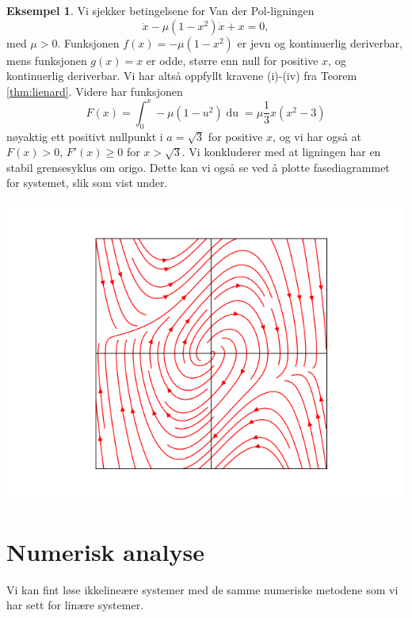 \documentclass{article}
\theoremstyle{plain}
\theoremstyle{definition}
\newtheorem{eksempel}[teorem]{Eksempel}
\theoremstyle{remark}
\newcommand{\diff}[1]{\mathop{d#1}}
\begin{document}
\begin{eksempel}
    Vi sjekker betingelsene for Van der Pol-ligningen
    \begin{equation*}
        \ddot{x} - \mu (1 - x^2) \dot{x} + x = 0,
    \end{equation*}
    med $\mu > 0$. Funksjonen $f(x) = -\mu (1 - x^2)$ er jevn og kontinuerlig deriverbar, mens funksjonen $g(x) = x$ er odde, større enn null for positive $x$, og kontinuerlig deriverbar. Vi har altså oppfyllt kravene (i)-(iv) fra Teorem \ref{thm:lienard}. Videre har funksjonen
    \begin{equation*}
        F(x) = \int_0^x -\mu(1-u^2) \diff{u} = \mu \frac{1}{3} x (x^2-3)
    \end{equation*}
    nøyaktig ett positivt nullpunkt i $a = \sqrt{3}$ for positive $x$, og vi har også at $F(x) > 0$, $F'(x) \geq 0$ for $x > \sqrt{3}$. Vi konkluderer med at ligningen har en stabil grensesyklus om origo. Dette kan vi også se ved å plotte fasediagrammet for systemet, slik som vist under.
    \begin{center}
        \includegraphics[scale=0.5]{van_der_pol.png}
    \end{center}
\end{eksempel}


\section*{Numerisk analyse}

Vi kan fint løse ikkelineære systemer med de samme numeriske metodene som vi har sett for linære systemer.
\end{document}
